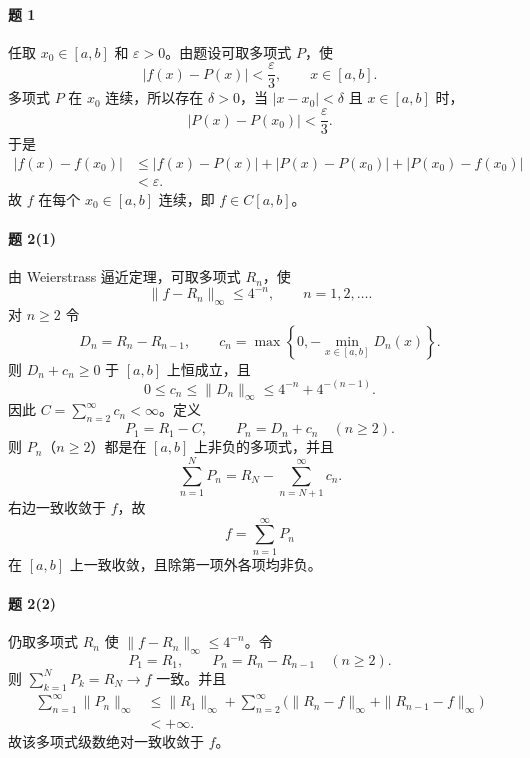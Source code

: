 \paragraph{题 1}
\begin{xsolution}
任取 $x_0\in[a,b]$ 和 $\varepsilon>0$。由题设可取多项式 $P$，使
\[
  |f(x)-P(x)|<\frac\varepsilon3,
  \qquad x\in[a,b].
\]
多项式 $P$ 在 $x_0$ 连续，所以存在 $\delta>0$，当 $|x-x_0|<\delta$ 且 $x\in[a,b]$ 时，
\[
  |P(x)-P(x_0)|<\frac\varepsilon3.
\]
于是
\[
\begin{aligned}
  |f(x)-f(x_0)|
  &\leqslant|f(x)-P(x)|+|P(x)-P(x_0)|+|P(x_0)-f(x_0)|\\
  &<\varepsilon.
\end{aligned}
\]
故 $f$ 在每个 $x_0\in[a,b]$ 连续，即 $f\in C[a,b]$。
\end{xsolution}

\paragraph{题 2(1)}
\begin{xsolution}
由 Weierstrass 逼近定理，可取多项式 $R_n$，使
\[
  \|f-R_n\|_\infty\leqslant4^{-n},\qquad n=1,2,\ldots.
\]
对 $n\geqslant2$ 令
\[
  D_n=R_n-R_{n-1},\qquad
  c_n=\max\left\{0,-\min_{x\in[a,b]}D_n(x)\right\}.
\]
则 $D_n+c_n\geqslant0$ 于 $[a,b]$ 上恒成立，且
\[
  0\leqslant c_n\leqslant\|D_n\|_\infty
  \leqslant4^{-n}+4^{-(n-1)}.
\]
因此 $C=\sum_{n=2}^{\infty}c_n<\infty$。定义
\[
  P_1=R_1-C,
  \qquad P_n=D_n+c_n\quad(n\geqslant2).
\]
则 $P_n$（$n\geqslant2$）都是在 $[a,b]$ 上非负的多项式，并且
\[
  \sum_{n=1}^NP_n
  =R_N-\sum_{n=N+1}^{\infty}c_n.
\]
右边一致收敛于 $f$，故
\[
  f=\sum_{n=1}^{\infty}P_n
\]
在 $[a,b]$ 上一致收敛，且除第一项外各项均非负。
\end{xsolution}

\paragraph{题 2(2)}
\begin{xsolution}
仍取多项式 $R_n$ 使 $\|f-R_n\|_\infty\leqslant4^{-n}$。令
\[
  P_1=R_1,
  \qquad P_n=R_n-R_{n-1}\quad(n\geqslant2).
\]
则 $\sum_{k=1}^NP_k=R_N\to f$ 一致。并且
\[
\begin{aligned}
  \sum_{n=1}^{\infty}\|P_n\|_\infty
  &\leqslant\|R_1\|_\infty
  +\sum_{n=2}^{\infty}
  \bigl(\|R_n-f\|_\infty+\|R_{n-1}-f\|_\infty\bigr)\\
  &<+\infty.
\end{aligned}
\]
故该多项式级数绝对一致收敛于 $f$。
\end{xsolution}

